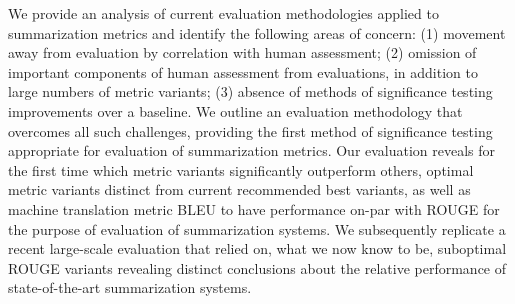 We provide an analysis of current evaluation methodologies applied to summarization metrics and identify the following areas of concern: (1) movement away from evaluation by correlation with human assessment; (2) omission of important components of human assessment from evaluations, in addition to large numbers of metric variants; (3) absence of methods of significance testing improvements over a baseline. We outline an evaluation methodology that overcomes all such challenges, providing the first method of significance testing appropriate for evaluation of summarization metrics. Our evaluation reveals for the first time which metric variants significantly outperform others, optimal metric variants distinct from current recommended best variants, as well as machine translation metric BLEU to have performance on-par with ROUGE for the purpose of evaluation of summarization systems. We  subsequently replicate a recent large-scale evaluation that relied on, what we now know to be, suboptimal ROUGE variants revealing distinct conclusions about the relative performance of state-of-the-art summarization systems.

